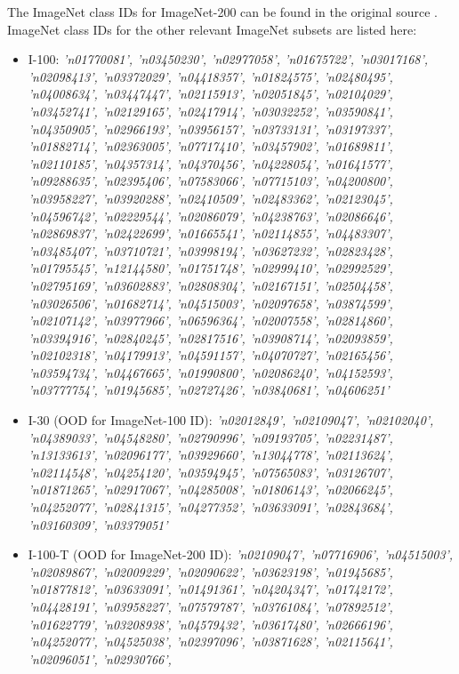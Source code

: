 The ImageNet class IDs for ImageNet-200 can be found in the original source \cite{zhang2023openood}. ImageNet class IDs for the other relevant ImageNet subsets are listed here:
\begin{itemize}
	\item I-100: \textit{
		'n01770081', 'n03450230', 'n02977058', 'n01675722', 'n03017168', 'n02098413',
		'n03372029', 'n04418357', 'n01824575', 'n02480495', 'n04008634', 'n03447447',
		'n02115913', 'n02051845', 'n02104029', 'n03452741', 'n02129165', 'n02417914',
		'n03032252', 'n03590841', 'n04350905', 'n02966193', 'n03956157', 'n03733131',
		'n03197337', 'n01882714', 'n02363005', 'n07717410', 'n03457902', 'n01689811',
		'n02110185', 'n04357314', 'n04370456', 'n04228054', 'n01641577', 'n09288635',
		'n02395406', 'n07583066', 'n07715103', 'n04200800', 'n03958227', 'n03920288',
		'n02410509', 'n02483362', 'n02123045', 'n04596742', 'n02229544', 'n02086079',
		'n04238763', 'n02086646', 'n02869837', 'n02422699', 'n01665541', 'n02114855',
		'n04483307', 'n03485407', 'n03710721', 'n03998194', 'n03627232', 'n02823428',
		'n01795545', 'n12144580', 'n01751748', 'n02999410', 'n02992529', 'n02795169',
		'n03602883', 'n02808304', 'n02167151', 'n02504458', 'n03026506', 'n01682714',
		'n04515003', 'n02097658', 'n03874599', 'n02107142', 'n03977966', 'n06596364',
		'n02007558', 'n02814860', 'n03394916', 'n02840245', 'n02817516', 'n03908714',
		'n02093859', 'n02102318', 'n04179913', 'n04591157', 'n04070727', 'n02165456',
		'n03594734', 'n04467665', 'n01990800', 'n02086240', 'n04152593', 'n03777754',
		'n01945685', 'n02727426', 'n03840681', 'n04606251'
	}
	\item I-30 (OOD for ImageNet-100 ID): \textit{
		'n02012849', 'n02109047', 'n02102040', 'n04389033', 'n04548280', 'n02790996',
		'n09193705', 'n02231487', 'n13133613', 'n02096177', 'n03929660', 'n13044778',
		'n02113624', 'n02114548', 'n04254120', 'n03594945', 'n07565083', 'n03126707',
		'n01871265', 'n02917067', 'n04285008', 'n01806143', 'n02066245', 'n04252077',
		'n02841315', 'n04277352', 'n03633091', 'n02843684', 'n03160309', 'n03379051'
	}
	\item I-100-T (OOD for ImageNet-200 ID): \textit{
		'n02109047', 'n07716906', 'n04515003', 'n02089867', 'n02009229', 'n02090622',
		'n03623198', 'n01945685', 'n01877812', 'n03633091', 'n01491361', 'n04204347',
		'n01742172', 'n04428191', 'n03958227', 'n07579787', 'n03761084', 'n07892512',
		'n01622779', 'n03208938', 'n04579432', 'n03617480', 'n02666196', 'n04252077',
		'n04525038', 'n02397096', 'n03871628', 'n02115641', 'n02096051', 'n02930766',
}
\end{itemize}
